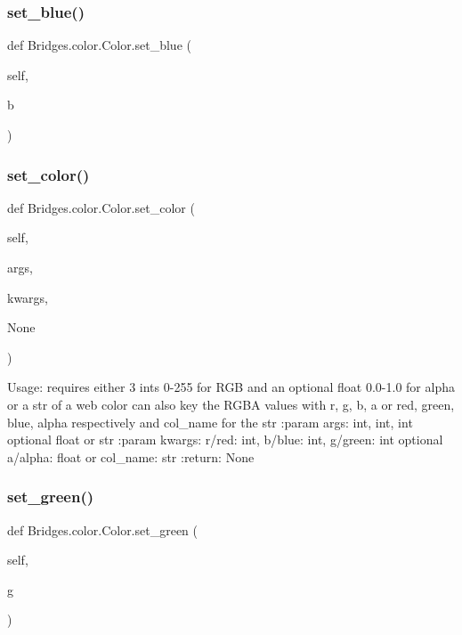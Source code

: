 \subsubsection{\texorpdfstring{set\+\_\+blue()}{set\_blue()}}
{\footnotesize\ttfamily def Bridges.\+color.\+Color.\+set\+\_\+blue (\begin{DoxyParamCaption}\item[{}]{self,  }\item[{}]{b }\end{DoxyParamCaption})}

\mbox{\label{class_bridges_1_1color_1_1_color_a747d78b7ff8981b1f93749bd53aeab7b}} 
\subsubsection{\texorpdfstring{set\+\_\+color()}{set\_color()}}
{\footnotesize\ttfamily def Bridges.\+color.\+Color.\+set\+\_\+color (\begin{DoxyParamCaption}\item[{}]{self,  }\item[{}]{args,  }\item[{}]{kwargs,  }\item[{}]{None }\end{DoxyParamCaption})}

\begin{DoxyVerb}Usage: requires either 3 ints 0-255 for RGB and an optional float 0.0-1.0 for alpha or a str of a web color
can also key the RGBA values with r, g, b, a or red, green, blue, alpha respectively and col_name for the str
:param args: int, int, int optional float or str
:param kwargs: r/red: int, b/blue: int, g/green: int optional a/alpha: float or col_name: str
:return: None
\end{DoxyVerb}
 \mbox{\label{class_bridges_1_1color_1_1_color_ab6f15725fa7f2290c325a808a487b3dd}} 
\subsubsection{\texorpdfstring{set\+\_\+green()}{set\_green()}}
{\footnotesize\ttfamily def Bridges.\+color.\+Color.\+set\+\_\+green (\begin{DoxyParamCaption}\item[{}]{self,  }\item[{}]{g }\end{DoxyParamCaption})}

